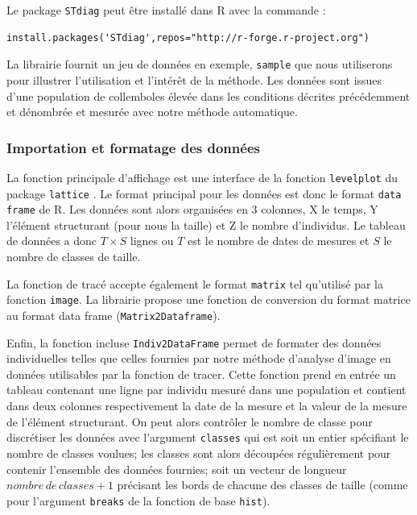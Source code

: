 Le package \texttt{STdiag} peut être installé dans R avec la commande :
\begin{verbatim}
install.packages('STdiag',repos="http://r-forge.r-project.org")
\end{verbatim}

La librairie fournit un jeu de données en exemple, \texttt{sample} que nous
utiliserons pour illustrer l'utilisation et l'intérêt de la méthode. Les données
sont issues d'une population de collemboles élevée dans les conditions décrites
précédemment et dénombrée et mesurée avec notre méthode automatique. 

\subsubsection{Importation et formatage des données}

La fonction principale d'affichage est une interface de la fonction
\texttt{levelplot} du package \texttt{lattice} \autocites{sarkar2008a}. Le
format principal pour les données est donc le format \texttt{data frame} de R.
Les données sont alors organisées en 3 colonnes, X le temps, Y l'élément
structurant (pour nous la taille) et Z le nombre d'individus. Le tableau de
données a donc $T \times S$ lignes ou $T$ est le nombre de dates de mesures et
$S$ le nombre de classes de taille.

La fonction de tracé accepte également le format \texttt{matrix} tel qu'utilisé
par la fonction \texttt{image}. La librairie propose une fonction de
conversion du format matrice au format data frame (\texttt{Matrix2Dataframe}).


Enfin, la fonction incluse \texttt{Indiv2DataFrame} permet de formater des
données individuelles telles que celles fournies par notre méthode d'analyse
d'image en données utilisables par la fonction de tracer.
Cette fonction prend en entrée un tableau contenant une ligne par individu mesuré dans
une population et contient dans deux colonnes respectivement la date de la
mesure et la valeur de la mesure de l'élément structurant. On peut alors
contrôler le nombre de classe pour discrétiser les données avec l'argument
\texttt{classes} qui est soit un entier spécifiant le nombre de classes voulues;
les classes sont alors découpées régulièrement pour contenir l'ensemble des
données fournies; soit un vecteur de longueur $nombre\,de\,classes + 1$
précisant les bords de chacune des classes de taille (comme pour l'argument
\texttt{breaks} de la fonction de base \texttt{hist}).

